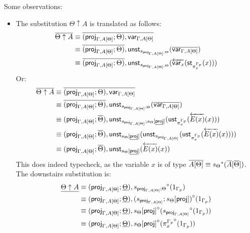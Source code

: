 \documentclass[10pt]{article}
\theoremstyle{definition}
\newcommand{\rewrite}[2]{\overleftarrow{#1}(#2)}
\newcommand\St[2]{\ensuremath{{#1}^*(#2)}}
\newcommand\StI[2]{\ensuremath{\mathsf{st}_{#1}(#2)}}
\newcommand\UStI[2]{\ensuremath{\mathsf{ust}_{#1}(#2)}}
\newcommand\UnSt[2]{\ensuremath{\mathsf{unst}_{#1}(#2)}}
\newcommand\TrCirc[2]{\ensuremath{{#1}^\circ(#2)}}
\newcommand\proj[1]{\ensuremath{\mathsf{proj}_{#1}}}
\newcommand\var[1]{\ensuremath{\mathsf{var}_{#1}}}
\begin{document}
Some observations:
\begin{itemize}
\item The substitution $\Theta \uparrow A$ is translated as follows:
\begin{align*}
\upstairs{\Theta \uparrow A} 
&\equiv \upstairs{(\proj{\Gamma, A[\Theta]}; \Theta) , \var{\Gamma, A[\Theta]}} \\
&\equiv \upstairs{(\proj{\Gamma, A[\Theta]}; \Theta)} , \UnSt{s_{\proj{\Gamma, A[\Theta]}; \Theta}}{\upstairs{\var{\Gamma, A[\Theta]}}} \\
&\equiv \upstairs{(\proj{\Gamma, A[\Theta]}; \Theta)} , \UnSt{s_{\proj{\Gamma, A[\Theta]}; \Theta}}{\rewrite{\var{x}}{\StI{\pi^{\asdep{\Gamma}}_x}{x}}} \\
\end{align*}
Or:
\begin{align*}
\upstairs{\Theta \uparrow A} 
&\equiv \upstairs{(\proj{\Gamma, A[\Theta]}; \Theta) , \var{\Gamma, A[\Theta]}} \\
&\equiv \upstairs{(\proj{\Gamma, A[\Theta]}; \Theta)} , \UnSt{s_{\proj{\Gamma, A[\Theta]}; \Theta}}{\upstairs{\var{\Gamma, A[\Theta]}}} \\
&\equiv (\proj{\Gamma, A[\Theta]};  \upstairs{\Theta}) , \UnSt{s_{\proj{\Gamma, A[\Theta]}} ; s_{\Theta}[\downstairs{\mathsf{proj}}]}{\UStI{\pi^{\asdep{\Gamma}}_x}{\rewrite{E(x)}{x}}} \\
&\equiv (\proj{\Gamma, A[\Theta]};  \upstairs{\Theta}) , \UnSt{ s_{\Theta}[\downstairs{\mathsf{proj}}]}{\UnSt{s_{\proj{\Gamma, A[\Theta]}}}{\UStI{\pi^{\asdep{\Gamma}}_x}{\rewrite{E(x)}{x}}}} \\
&\equiv (\proj{\Gamma, A[\Theta]};  \upstairs{\Theta}) , \UnSt{ s_{\Theta}[\downstairs{\mathsf{proj}}]}{\rewrite{E(x)}{x}}
\end{align*}
This does indeed typecheck, as the variable $x$ is of type $\upstairs{A[\Theta]} \equiv \St{s_{\Theta}}{\upstairs{A}[\upstairs{\Theta}]}$. The downstairs substitution is:
\begin{align*}
\downstairs{\Theta \uparrow A} 
&\equiv (\proj{\Gamma, A[\Theta]};  \downstairs{\Theta}) , \TrCirc{s_{\proj{\Gamma, A[\Theta]}; \Theta}}{1_{\asdep{\Gamma}}} \\
&\equiv (\proj{\Gamma, A[\Theta]};  \downstairs{\Theta}) , \TrCirc{(s_{\proj{\Gamma, A[\Theta]}};s_{\Theta}[\mathsf{proj}])}{1_{\asdep{\Gamma}}} \\
&\equiv (\proj{\Gamma, A[\Theta]};  \downstairs{\Theta}) , \TrCirc{s_{\Theta}[\mathsf{proj}]}{\TrCirc{s_{\proj{\Gamma, A[\Theta]}}}{1_{\asdep{\Gamma}}}} \\
&\equiv (\proj{\Gamma, A[\Theta]};  \downstairs{\Theta}) , \TrCirc{s_{\Theta}[\mathsf{proj}]}{\TrCirc{\pi^{\asdep{\Gamma}}_x}{1_{\asdep{\Gamma}}}} \\
\end{align*}


\end{itemize}
\end{document}
